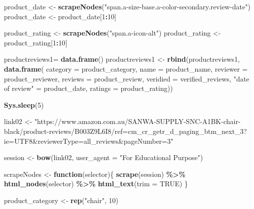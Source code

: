 \documentclass[
]{article}
\newenvironment{Shaded}{\begin{snugshade}}{\end{snugshade}}
\newcommand{\AttributeTok}[1]{\textcolor[rgb]{0.13,0.29,0.53}{#1}}
\newcommand{\ConstantTok}[1]{\textcolor[rgb]{0.56,0.35,0.01}{#1}}
\newcommand{\ControlFlowTok}[1]{\textcolor[rgb]{0.13,0.29,0.53}{\textbf{#1}}}
\newcommand{\DecValTok}[1]{\textcolor[rgb]{0.00,0.00,0.81}{#1}}
\newcommand{\FunctionTok}[1]{\textcolor[rgb]{0.13,0.29,0.53}{\textbf{#1}}}
\newcommand{\NormalTok}[1]{#1}
\newcommand{\OtherTok}[1]{\textcolor[rgb]{0.56,0.35,0.01}{#1}}
\newcommand{\SpecialCharTok}[1]{\textcolor[rgb]{0.81,0.36,0.00}{\textbf{#1}}}
\newcommand{\StringTok}[1]{\textcolor[rgb]{0.31,0.60,0.02}{#1}}
\begin{document}
\begin{Shaded}
\begin{Highlighting}[]
\NormalTok{  product\_date }\OtherTok{\textless{}{-}} \FunctionTok{scrapeNodes}\NormalTok{(}\StringTok{"span.a{-}size{-}base.a{-}color{-}secondary.review{-}date"}\NormalTok{)}
\NormalTok{  product\_date }\OtherTok{\textless{}{-}}\NormalTok{ product\_date[}\DecValTok{1}\SpecialCharTok{:}\DecValTok{10}\NormalTok{]}
  
\NormalTok{  product\_rating }\OtherTok{\textless{}{-}} \FunctionTok{scrapeNodes}\NormalTok{(}\StringTok{"span.a{-}icon{-}alt"}\NormalTok{)}
\NormalTok{  product\_rating }\OtherTok{\textless{}{-}}\NormalTok{ product\_rating[}\DecValTok{1}\SpecialCharTok{:}\DecValTok{10}\NormalTok{]}
  
\NormalTok{  productreviews1}\OtherTok{=} \FunctionTok{data.frame}\NormalTok{()}
\NormalTok{  productreviews1 }\OtherTok{\textless{}{-}} \FunctionTok{rbind}\NormalTok{(productreviews1, }\FunctionTok{data.frame}\NormalTok{(}
                      \AttributeTok{category =}\NormalTok{ product\_category,}
                      \AttributeTok{name =}\NormalTok{ product\_name,}
                      \AttributeTok{reviewer =}\NormalTok{ product\_reviewer,}
                      \AttributeTok{reviews =}\NormalTok{ product\_review,}
                      \AttributeTok{veridied =}\NormalTok{ verified\_reviews,}
                      \StringTok{"date of review"} \OtherTok{=}\NormalTok{ product\_date,}
                      \AttributeTok{ratings =}\NormalTok{ product\_rating))}

  \FunctionTok{Sys.sleep}\NormalTok{(}\DecValTok{5}\NormalTok{)}

\NormalTok{link02 }\OtherTok{\textless{}{-}} \StringTok{"https://www.amazon.com.au/SANWA{-}SUPPLY{-}SNC{-}A1BK{-}chair{-}black/product{-}reviews/B003Z9L6I8/ref=cm\_cr\_getr\_d\_paging\_btm\_next\_3?ie=UTF8\&reviewerType=all\_reviews\&pageNumber=3"}


\NormalTok{  session }\OtherTok{\textless{}{-}} \FunctionTok{bow}\NormalTok{(link02,}
               \AttributeTok{user\_agent =} \StringTok{"For Educational Purpose"}\NormalTok{)}

\NormalTok{  scrapeNodes }\OtherTok{\textless{}{-}} \ControlFlowTok{function}\NormalTok{(selector)\{}
    \FunctionTok{scrape}\NormalTok{(session) }\SpecialCharTok{\%\textgreater{}\%}
      \FunctionTok{html\_nodes}\NormalTok{(selector) }\SpecialCharTok{\%\textgreater{}\%}
      \FunctionTok{html\_text}\NormalTok{(}\AttributeTok{trim =} \ConstantTok{TRUE}\NormalTok{)}
\NormalTok{  \}}

\NormalTok{  product\_category }\OtherTok{\textless{}{-}} \FunctionTok{rep}\NormalTok{(}\StringTok{"chair"}\NormalTok{, }\DecValTok{10}\NormalTok{)}


\end{Highlighting}
\end{Shaded}
\end{document}
